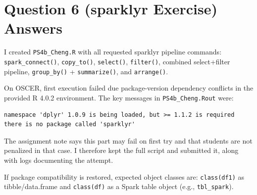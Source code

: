 \documentclass[11pt]{article}
\begin{document}
\section*{Question 6 (sparklyr Exercise) Answers}
I created \texttt{PS4b\_Cheng.R} with all requested sparklyr pipeline commands:
\texttt{spark\_connect()}, \texttt{copy\_to()}, \texttt{select()},
\texttt{filter()}, combined select+filter pipeline, \texttt{group\_by()} +
\texttt{summarize()}, and \texttt{arrange()}.

On OSCER, first execution failed due package-version dependency conflicts in the
provided R 4.0.2 environment. The key messages in \texttt{PS4b\_Cheng.Rout}
were:
\begin{verbatim}
namespace 'dplyr' 1.0.9 is being loaded, but >= 1.1.2 is required
there is no package called 'sparklyr'
\end{verbatim}

The assignment note says this part may fail on first try and that students are
not penalized in that case. I therefore kept the full script and submitted it,
along with logs documenting the attempt.

If package compatibility is restored, expected object classes are:
\texttt{class(df1)} as tibble/data.frame and \texttt{class(df)} as a Spark
table object (e.g., \texttt{tbl\_spark}).
\end{document}
